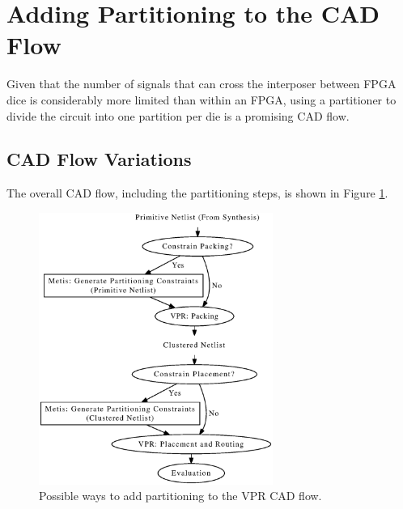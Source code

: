 \section{Adding Partitioning to the CAD Flow}
\label{sec:CADflow}
Given that the number of signals that can cross the interposer between FPGA dice is considerably more limited than within an FPGA, using a partitioner to divide the circuit into one partition per die is a promising CAD flow.

\subsection{CAD Flow Variations}
The overall CAD flow, including the partitioning steps, is shown in Figure \ref{fig:partitioning_cad_flow}.
\begin{figure}[!htbp]
\centering
\includegraphics[height=3.5in]{partitioning_cad_flow.eps}
\caption{Possible ways to add partitioning to the VPR CAD flow.}
\label{fig:partitioning_cad_flow}
\end{figure}

